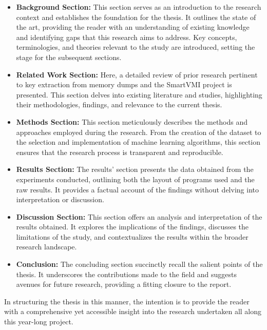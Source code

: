 	\begin{itemize}
		\item \textbf{Background Section:} This section serves as an introduction to the research context and establishes the foundation for the thesis. It outlines the state of the art, providing the reader with an understanding of existing knowledge and identifying gaps that this research aims to address. Key concepts, terminologies, and theories relevant to the study are introduced, setting the stage for the subsequent sections.
		
		\item \textbf{Related Work Section:} Here, a detailed review of prior research pertinent to key extraction from memory dumps and the SmartVMI project is presented. This section delves into existing literature and studies, highlighting their methodologies, findings, and relevance to the current thesis.
		
		\item \textbf{Methods Section:} This section meticulously describes the methods and approaches employed during the research. From the creation of the dataset to the selection and implementation of machine learning algorithms, this section ensures that the research process is transparent and reproducible.
		
		\item \textbf{Results Section:} The results' section presents the data obtained from the experiments conducted, outlining both the layout of programs used and the raw results. It provides a factual account of the findings without delving into interpretation or discussion.
		
		\item \textbf{Discussion Section:} This section offers an analysis and interpretation of the results obtained. It explores the implications of the findings, discusses the limitations of the study, and contextualizes the results within the broader research landscape.
		
		\item \textbf{Conclusion:} The concluding section succinctly recall the salient points of the thesis. It underscores the contributions made to the field and suggests avenues for future research, providing a fitting closure to the report.
	\end{itemize}
	
	In structuring the thesis in this manner, the intention is to provide the reader with a comprehensive yet accessible insight into the research undertaken all along this year-long project. 
	

